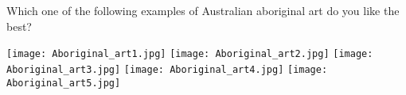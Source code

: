 
\begin{tcolorbox}
Which one of the following examples of Australian aboriginal art do you like the best?

\texttt{[image: Aboriginal\_art1.jpg]}
\texttt{[image: Aboriginal\_art2.jpg]}
\texttt{[image: Aboriginal\_art3.jpg]}
\texttt{[image: Aboriginal\_art4.jpg]}
\texttt{[image: Aboriginal\_art5.jpg]}
\end{tcolorbox}
